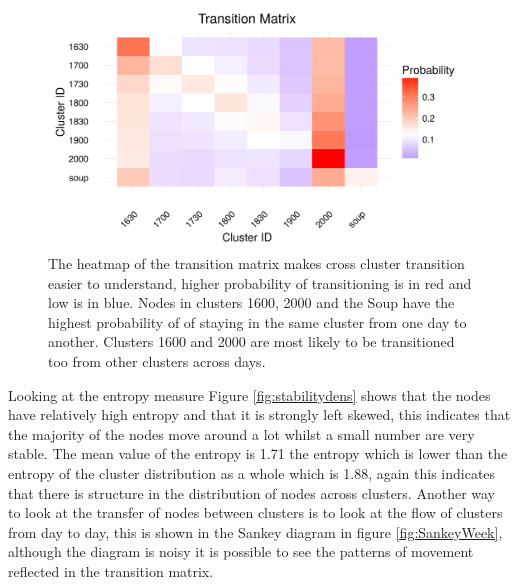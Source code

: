 \begin{figure}[ht]
    \centering
    \includegraphics{Figures/Results/Clusttransgraph.png}
    \caption[Cluster family transition matrix]{The heatmap of the transition matrix makes cross cluster transition easier to understand, higher probability of transitioning is in red and low is in blue. Nodes in clusters 1600, 2000 and the Soup have the highest probability of of staying in the same cluster from one day to another. Clusters 1600 and 2000 are most likely to be transitioned too from other clusters across days.}
    \label{fig:TransitionHeat}
\end{figure}


Looking at the entropy measure Figure \ref{fig:stabilitydens} shows that the nodes have relatively high entropy and that it is strongly left skewed, this indicates that the majority of the nodes move around a lot whilst a small number are very stable. The mean value of the entropy is 1.71 the entropy which is lower than the entropy of the cluster distribution as a whole which is 1.88, again this indicates that there is structure in the distribution of nodes across clusters. Another way to look at the transfer of nodes between clusters is to look at the flow of clusters from day to day, this is shown in the Sankey diagram in figure \ref{fig:SankeyWeek}, although the diagram is noisy it is possible to see the patterns of movement reflected in the transition matrix.



